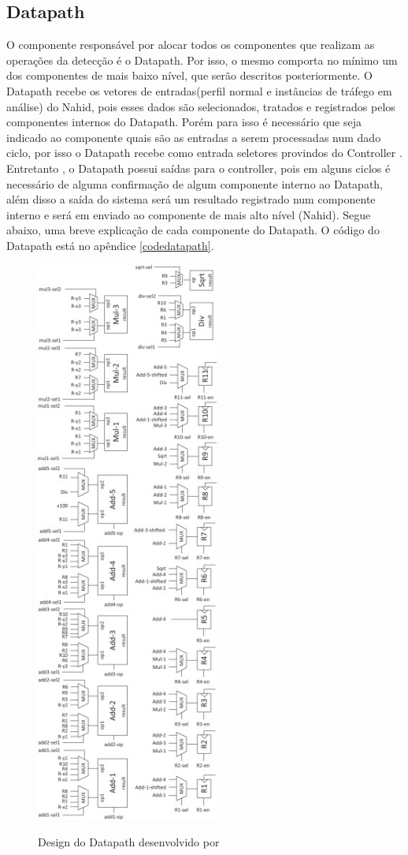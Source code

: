 \subsection{Datapath}

O componente responsável por alocar todos os componentes que realizam as operações da detecção  é o Datapath. Por isso, o mesmo comporta no mínimo um dos componentes de mais baixo nível, que serão descritos posteriormente. O Datapath recebe os vetores de entradas(perfil normal e instâncias de tráfego em análise) do Nahid, pois esses dados são selecionados, tratados e registrados pelos componentes internos do Datapath. Porém para isso é necessário que seja indicado ao componente quais são as entradas a serem processadas num dado ciclo, por isso o Datapath recebe como entrada seletores provindos do Controller . Entretanto , o Datapath possui saídas para o controller, pois em alguns ciclos é necessário de alguma confirmação de algum componente  interno ao Datapath, além disso a saída do sistema será um resultado registrado num componente interno e será em enviado ao componente de mais alto nível (Nahid). Segue abaixo, uma breve explicação de cada componente do Datapath. O código do Datapath está no apêndice \ref{codedatapath}.


\begin{figure}[H]
	\centering
	\includegraphics[width=6cm]{figures/dp.jpg}\\
	\caption{Design do Datapath desenvolvido por \cite{HOQUE201748}}
	\label{extend}
\end{figure}



